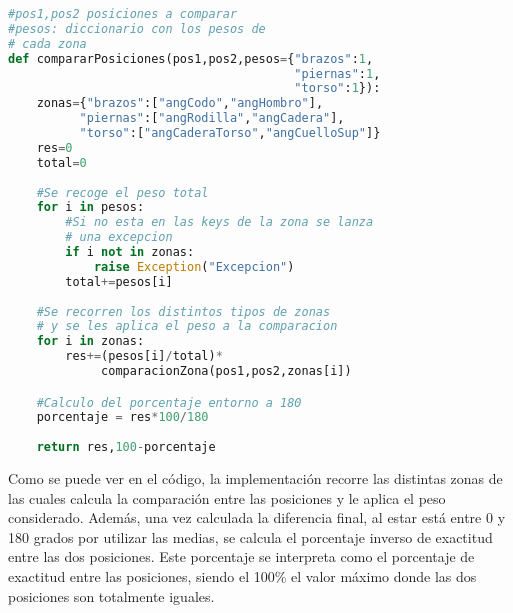 {\begin{lstlisting}[language=Python]
#pos1,pos2 posiciones a comparar
#pesos: diccionario con los pesos de
# cada zona
def compararPosiciones(pos1,pos2,pesos={"brazos":1,
										"piernas":1,
										"torso":1}):
    zonas={"brazos":["angCodo","angHombro"],
    	  "piernas":["angRodilla","angCadera"],
    	  "torso":["angCaderaTorso","angCuelloSup"]}
    res=0
    total=0
    
    #Se recoge el peso total
    for i in pesos:
    	#Si no esta en las keys de la zona se lanza
    	# una excepcion
        if i not in zonas:
            raise Exception("Excepcion")
        total+=pesos[i]
        
    #Se recorren los distintos tipos de zonas
    # y se les aplica el peso a la comparacion
    for i in zonas:
        res+=(pesos[i]/total)*
        	 comparacionZona(pos1,pos2,zonas[i])

	#Calculo del porcentaje entorno a 180
    porcentaje = res*100/180
 
    return res,100-porcentaje
\end{lstlisting}

Como se puede ver en el código, la implementación recorre las distintas zonas de las cuales calcula la comparación entre las posiciones y le aplica el peso considerado. Además, una vez calculada la diferencia final, al estar está entre 0 y 180 grados por utilizar las medias, se calcula el porcentaje inverso de exactitud entre las dos posiciones. Este porcentaje se interpreta como el porcentaje de exactitud entre las posiciones, siendo el 100\% el valor máximo donde las dos posiciones son totalmente iguales.

}
